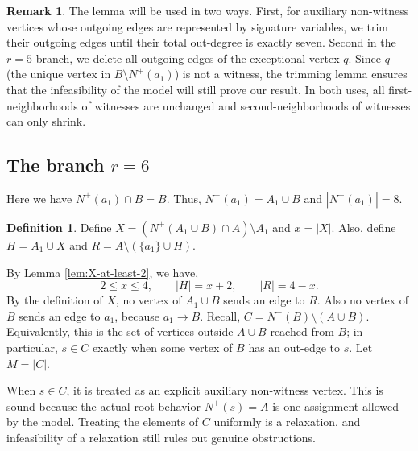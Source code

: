 \documentclass[a4paper,fleqn]{cas-sc}
\theoremstyle{definition}
\newtheorem{definition}[theorem]{Definition}
\newtheorem{remark}[theorem]{Remark}
\begin{document}
\begin{remark}
    The lemma will be used in two ways. First, for auxiliary non-witness vertices whose outgoing edges are represented by signature variables, we trim their outgoing edges until their total out-degree is exactly seven. Second in the $r=5$ branch, we delete all outgoing edges of the exceptional vertex $q$. Since $q$ (the unique vertex in $B\setminus N^+(a_1)$) is not a witness, the trimming lemma ensures that the infeasibility of the model will still prove our result. In both uses, all first-neighborhoods of witnesses are unchanged and second-neighborhoods of witnesses can only shrink. 
\end{remark}







\subsection{The branch $r=6$}

Here we have $N^+(a_1)\cap B=B$. Thus, $N^+(a_1)=A_1\cup B$ and $|N^+(a_1)|=8$.

\begin{definition}
    Define $X=(N^+(A_1\cup B)\cap A)\setminus A_1$ and $x=|X|$. Also, define $H=A_1\cup X$ and $R=A\setminus(\{a_1\}\cup H)$.
\end{definition}

By Lemma \ref{lem:X-at-least-2}, we have, \[2\le x\le 4,
\qquad |H|=x+2,
\qquad |R|=4-x.
\]
By the definition of $X$, no vertex of $A_1\cup B$ sends an edge to $R$.  Also no vertex of $B$ sends an edge to $a_1$, because $a_1\to B$. Recall, $C=N^+(B)\setminus(A\cup B)$.
Equivalently, this is the set of vertices outside $A\cup B$ reached from $B$; in particular, $s\in C$ exactly when some vertex of $B$ has an out-edge to $s$. Let $M=|C|$.

When $s\in C$, it is treated as an explicit auxiliary non-witness vertex. This is sound because the actual root behavior $N^+(s)=A$ is one assignment allowed by the model.  Treating the elements of $C$ uniformly is a relaxation, and infeasibility of a relaxation still rules out genuine obstructions.
\end{document}
